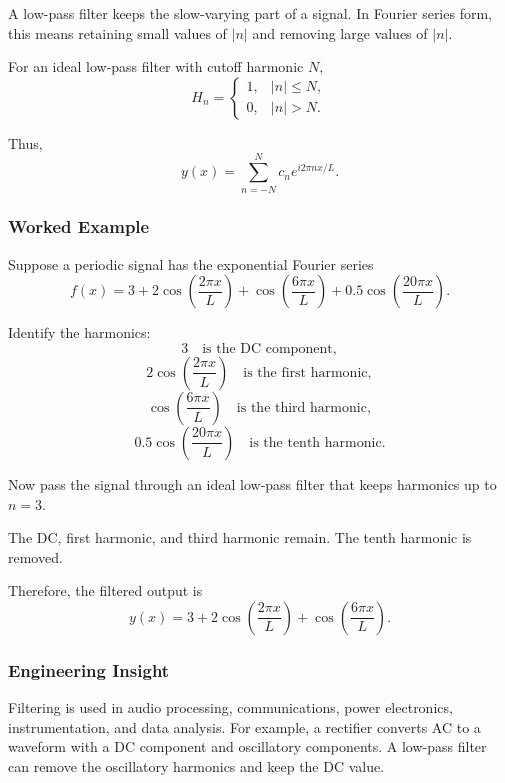 A low-pass filter keeps the slow-varying part of a signal. In Fourier series form, this means retaining small values of $|n|$ and removing large values of $|n|$.

For an ideal low-pass filter with cutoff harmonic $N$,
\[
    H_n=
    \begin{cases}
        1, & |n|\leq N, \\
        0, & |n|>N.
    \end{cases}
\]

Thus,
\[
    y(x)=\sum_{n=-N}^{N}c_n e^{i2\pi nx/L}.
\]

\subsubsection*{Worked Example}

\begin{examplebox}
    Suppose a periodic signal has the exponential Fourier series
    \[
        f(x)=3+2\cos\left(\frac{2\pi x}{L}\right)
        +\cos\left(\frac{6\pi x}{L}\right)
        +0.5\cos\left(\frac{20\pi x}{L}\right).
    \]

    Identify the harmonics:
    \[
        3 \quad \text{is the DC component},
    \]
    \[
        2\cos\left(\frac{2\pi x}{L}\right)
        \quad \text{is the first harmonic},
    \]
    \[
        \cos\left(\frac{6\pi x}{L}\right)
        \quad \text{is the third harmonic},
    \]
    \[
        0.5\cos\left(\frac{20\pi x}{L}\right)
        \quad \text{is the tenth harmonic}.
    \]

    Now pass the signal through an ideal low-pass filter that keeps harmonics up to $n=3$.

    The DC, first harmonic, and third harmonic remain. The tenth harmonic is removed.

    Therefore, the filtered output is
    \[
        y(x)=3+2\cos\left(\frac{2\pi x}{L}\right)
        +\cos\left(\frac{6\pi x}{L}\right).
    \]
\end{examplebox}

\subsubsection*{Engineering Insight}

\begin{noteBox}
    Filtering is used in audio processing, communications, power electronics, instrumentation, and data analysis. For example, a rectifier converts AC to a waveform with a DC component and oscillatory components. A low-pass filter can remove the oscillatory harmonics and keep the DC value.
\end{noteBox}

